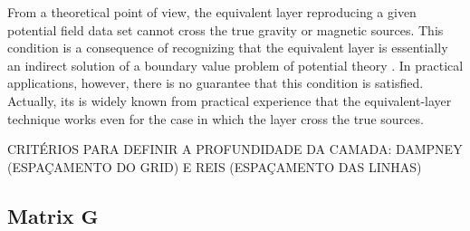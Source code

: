 From a theoretical point of view, the equivalent layer reproducing a given potential field data set cannot cross the
true gravity or magnetic sources. This condition is a consequence of recognizing that the equivalent layer is essentially an indirect solution of 
a boundary value problem of potential theory \citep[e.g.,][]{roy1962,zidarov1965,dampney1969,li_etal_2014,reis-etal2020}.
In practical applications, however, there is no guarantee that this condition is satisfied. 
Actually, its is widely known from practical experience \cite[e.g.,][]{gonzalez-etal2022} that the equivalent-layer technique
works even for the case in which the layer cross the true sources. 

CRITÉRIOS PARA DEFINIR A PROFUNDIDADE DA CAMADA: DAMPNEY (ESPAÇAMENTO DO GRID) E REIS (ESPAÇAMENTO DAS LINHAS)

\subsection{Matrix $\mathbf{G}$}
\label{subsec:sensitivity-matrix}

